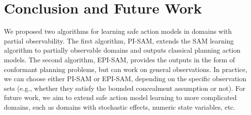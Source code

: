 \documentclass[letterpaper]{article} %
\newcommand{\pre}{\textit{pre}}
\newcommand{\eff}{\textit{eff}}
\begin{document}

                                

\section{Conclusion and Future Work}
We proposed two algorithms for learning safe action models in domains with partial observability. The first algorithm, PI-SAM, extends the SAM learning algorithm \citep{juba2021safe} to partially observable domains and outputs classical planning action models. The second algorithm, EPI-SAM, provides the outputs in the form of conformant planning problems, but can work on general observations. In practice,  we can choose either PI-SAM or EPI-SAM, depending on the specific observation sets (e.g., whether they satisfy the bounded concealment assumption or not). For future work, we aim to extend safe action model learning to more complicated domains, such as domains with stochastic effects, numeric state variables, etc. 




\end{document}
